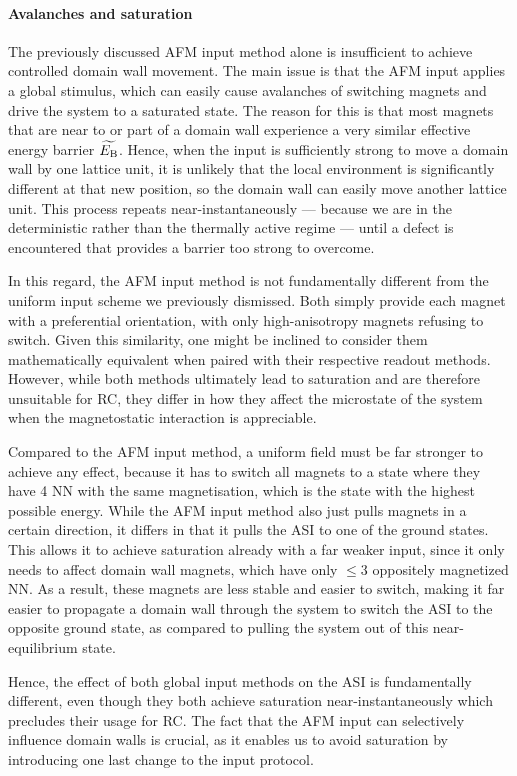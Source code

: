\paragraph{Avalanches and saturation}
The previously discussed AFM input method alone is insufficient to achieve controlled domain wall movement.
The main issue is that the AFM input applies a global stimulus, which can easily cause avalanches of switching magnets and drive the system to a saturated state.
The reason for this is that most magnets that are near to or part of a domain wall experience a very similar effective energy barrier $\widetilde{E_\mathrm{B}}$.
Hence, when the input is sufficiently strong to move a domain wall by one lattice unit, it is unlikely that the local environment is significantly different at that new position, so the domain wall can easily move another lattice unit.
This process repeats near-instantaneously --- because we are in the deterministic rather than the thermally active regime --- until a defect is encountered that provides a barrier too strong to overcome. \par
In this regard, the AFM input method is not fundamentally different from the uniform input scheme we previously dismissed.
Both simply provide each magnet with a preferential orientation, with only high-anisotropy magnets refusing to switch.
Given this similarity, one might be inclined to consider them mathematically equivalent when paired with their respective readout methods.
However, while both methods ultimately lead to saturation and are therefore unsuitable for RC, they differ in how they affect the microstate of the system when the magnetostatic interaction is appreciable. \par
Compared to the AFM input method, a uniform field must be far stronger to achieve any effect, because it has to switch all magnets to a state where they have 4 NN with the same magnetisation, which is the state with the highest possible energy.
While the AFM input method also just pulls magnets in a certain direction, it differs in that it pulls the ASI to one of the ground states.
This allows it to achieve saturation already with a far weaker input, since it only needs to affect domain wall magnets, which have only $\leq 3$ oppositely magnetized NN.
As a result, these magnets are less stable and easier to switch, making it far easier to propagate a domain wall through the system to switch the ASI to the opposite ground state, as compared to pulling the system out of this near-equilibrium state. \par
Hence, the effect of both global input methods on the ASI is fundamentally different, even though they both achieve saturation near-instantaneously which precludes their usage for RC.
The fact that the AFM input can selectively influence domain walls is crucial, as it enables us to avoid saturation by introducing one last change to the input protocol.

